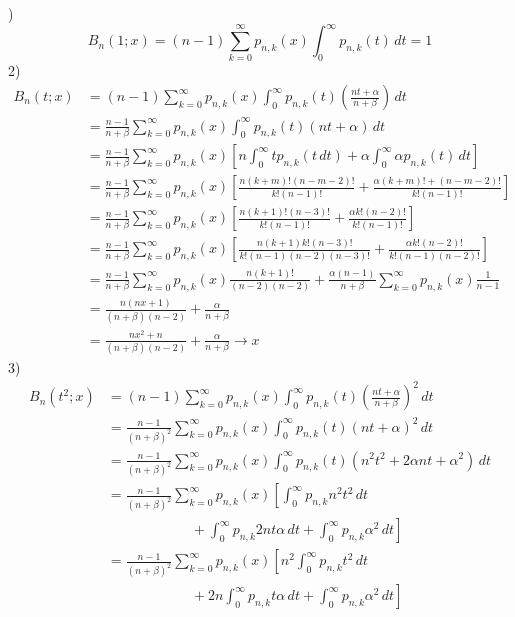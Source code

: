 \begin{english}
	)
	\[
	B_n(1; x) = (n-1) \sum_{k=0}^{\infty} p_{n, k}(x) \int_{0}^{\infty} p_{n, k}(t) \, dt = 1
	\]
	2)
	\begin{align*}
	B_n(t; x) &= (n-1) \sum_{k=0}^{\infty} p_{n, k}(x) \int_{0}^{\infty} p_{n, k}(t) \left(\frac{nt+\alpha}{n + \beta}\right)\, dt \\
	&= \frac{n-1}{n+\beta} \sum_{k=0}^{\infty} p_{n, k}(x) \int_{0}^{\infty} p_{n, k}(t) (nt + \alpha) \, dt\\
	&= \frac{n-1}{n+\beta} \sum_{k=0}^{\infty} p_{n, k}(x) \left[n\int_{0}^{\infty} t p_{n, k}(t\, dt) + \alpha \int_{0}^{\infty} \alpha p_{n,k}(t)\, dt\right]\\
	&= \frac{n-1}{n+\beta} \sum_{k=0}^{\infty} p_{n, k}(x) \left[\textstyle
	\frac{n(k+m)!(n-m-2)!}{k!(n-1)!} + \frac{\alpha(k+m)! + (n-m-2)!}{k!(n-1)!}
	\right]\\
	&= \frac{n-1}{n+\beta} \sum_{k=0}^{\infty} p_{n, k}(x) \left[\textstyle
	\frac{n(k+1)! (n-3)!}{k!(n-1)!} + \frac{\alpha k!(n-2)!}{k!(n-1)!}
	\right]\\
	&= \frac{n-1}{n+\beta} \sum_{k=0}^{\infty} p_{n, k}(x) \left[\textstyle
	\frac{n(k+1)k!(n-3)!}{k!(n-1)(n-2)(n-3)!} + \frac{\alpha k! (n-2)!}{k! (n-1)(n-2)!}
	\right]\\
	&= \frac{n-1}{n+\beta} \sum_{k=0}^{\infty} p_{n, k}(x) \frac{n(k+1)!}{(n-2)(n-2)} + \frac{\alpha(n-1)}{n+\beta} \sum_{k=0}^{\infty} p_{n, k}(x) \frac{1}{n-1}\\
	&= \frac{n(nx + 1)}{(n+\beta)(n-2)} + \frac{\alpha}{n + \beta}\\
	&= \frac{nx^2 + n}{(n+\beta)(n-2)} + \frac{\alpha}{n + \beta} \to x
	\end{align*}
	3)
	\begin{align*}
		B_n(t^2; x) &= (n-1) \sum_{k=0}^{\infty} p_{n, k}(x) \int_{0}^{\infty} p_{n, k}(t) \left(\frac{nt+\alpha}{n + \beta}\right)^2\, dt \\
     	&= \frac{n-1}{(n+\beta)^2} \sum_{k=0}^{\infty} p_{n, k}(x) \int_{0}^{\infty} p_{n, k}(t) (nt + \alpha)^2 \, dt\\
     	&= \frac{n-1}{(n+\beta)^2} \sum_{k=0}^{\infty} p_{n, k}(x) \int_{0}^{\infty} p_{n, k}(t) (n^2t^2 + 2\alpha n t + \alpha^2) \, dt\\
     	&= \frac{n-1}{(n+\beta)^2} \sum_{k=0}^{\infty} p_{n, k}(x) \left[
     	\int_{0}^{\infty} p_{n, k} n^2 t^2 \, dt 
     	\right.\\
     	& \qquad\qquad\qquad + \left.\int_{0}^{\infty} p_{n, k} 2 n t \alpha \, dt + \int_{0}^{\infty} p_{n, k} \alpha^2 \, dt \right]\\
     	&= \frac{n-1}{(n+\beta)^2} \sum_{k=0}^{\infty} p_{n, k}(x) \left[
     	n^2 \int_{0}^{\infty} p_{n, k} t^2 \, dt 
     	\right.\\
     	& \qquad\qquad\qquad + \left. 2n\int_{0}^{\infty} p_{n, k} t \alpha \, dt + \int_{0}^{\infty} p_{n, k} \alpha^2 \, dt \right]
	\end{align*}
\end{english}

